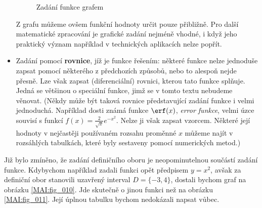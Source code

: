 \begin{itemize}[noitemsep]
          \begin{figure}[ht!]
            \centering  
            \caption{Zadání funkce grafem}
          \end{figure}
          Z grafu můžeme ovšem funkční hodnoty určit pouze přibližně. Pro další matematické 
          zpracování je grafické zadání nejméně vhodné, i když jeho praktický význam například v 
          technických aplikacích nelze popřít.
        \item Zadání pomocí \textbf{rovnice}, jíž je funkce řešením: některé funkce nelze jednoduše 
              zapsat pomocí některého z předchozích způsobů, nebo to alespoň nejde přesně. Lze však 
              zapsat (diferenciální) rovnici, kterou tato funkce splňuje. Jedná se většinou o 
              speciální funkce, jimž se v tomto textu nebudeme věnovat. (Někdy může být taková 
              rovnice  představující zadání funkce i velmi jednoduchá. Například dosti známá funkce 
              \(\erf(x)\), \emph{error funkce}, velmi úzce souvisí s funkcí \(f(x) = 
              \frac{2}{\sqrt{x}}e^{-x^2}\). Nelze ji však zapsat vzorcem. Některé její hodnoty v 
              nejčastěji používaném rozsahu proměnné \(x\) můžeme najít v rozsáhlých tabulkách, 
              které byly sestaveny pomocí numerických metod.)
      \end{itemize}
      
      Již bylo zmíněno, že zadání definičního oboru je neopominutelnou součástí zadání funkce. 
      Kdybychom například zadali funkci opět předpisem \(y=x^2\), avšak za definiční obor stanovili 
      uzavřený interval \(D = \lbrace -3,4\rbrace\), dostali bychom graf na obrázku 
      \ref{MAI:fig_010}. Jde skutečně o jinou funkci než na obrázku \ref{MAI:fig_011}. Její úplnou 
      tabulku bychom nedokázali napsat vůbec.
      

